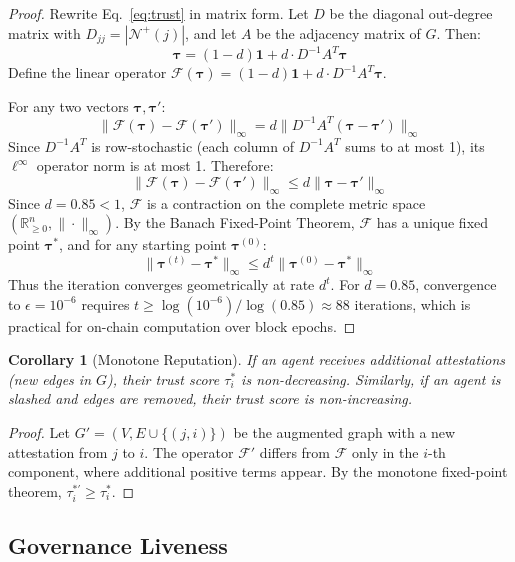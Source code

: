\documentclass[conference]{IEEEtran}
\newtheorem{corollary}{Corollary}
\begin{document}
\begin{proof}
Rewrite Eq.~\eqref{eq:trust} in matrix form. Let $D$ be the diagonal out-degree matrix with $D_{jj} = |\mathcal{N}^+(j)|$, and let $A$ be the adjacency matrix of $G$. Then:
\[
\boldsymbol{\tau} = (1-d)\mathbf{1} + d \cdot D^{-1}A^T \boldsymbol{\tau}
\]
Define the linear operator $\mathcal{F}(\boldsymbol{\tau}) = (1-d)\mathbf{1} + d \cdot D^{-1}A^T \boldsymbol{\tau}$.

For any two vectors $\boldsymbol{\tau}, \boldsymbol{\tau}'$:
\[
\|\mathcal{F}(\boldsymbol{\tau}) - \mathcal{F}(\boldsymbol{\tau}')\|_\infty = d\|D^{-1}A^T(\boldsymbol{\tau} - \boldsymbol{\tau}')\|_\infty
\]
Since $D^{-1}A^T$ is row-stochastic (each column of $D^{-1}A^T$ sums to at most 1), its $\ell^\infty$ operator norm is at most 1. Therefore:
\[
\|\mathcal{F}(\boldsymbol{\tau}) - \mathcal{F}(\boldsymbol{\tau}')\|_\infty \leq d \|\boldsymbol{\tau} - \boldsymbol{\tau}'\|_\infty
\]
Since $d = 0.85 < 1$, $\mathcal{F}$ is a contraction on the complete metric space $(\mathbb{R}^n_{\geq 0}, \|\cdot\|_\infty)$. By the Banach Fixed-Point Theorem, $\mathcal{F}$ has a unique fixed point $\boldsymbol{\tau}^*$, and for any starting point $\boldsymbol{\tau}^{(0)}$:
\[
\|\boldsymbol{\tau}^{(t)} - \boldsymbol{\tau}^*\|_\infty \leq d^t \|\boldsymbol{\tau}^{(0)} - \boldsymbol{\tau}^*\|_\infty
\]
Thus the iteration converges geometrically at rate $d^t$. For $d = 0.85$, convergence to $\epsilon = 10^{-6}$ requires $t \geq \log(10^{-6})/\log(0.85) \approx 88$ iterations, which is practical for on-chain computation over block epochs.
\end{proof}

\begin{corollary}[Monotone Reputation]
If an agent receives additional attestations (new edges in $G$), their trust score $\tau_i^*$ is non-decreasing. Similarly, if an agent is slashed and edges are removed, their trust score is non-increasing.
\end{corollary}

\begin{proof}
Let $G' = (V, E \cup \{(j, i)\})$ be the augmented graph with a new attestation from $j$ to $i$. The operator $\mathcal{F}'$ differs from $\mathcal{F}$ only in the $i$-th component, where additional positive terms appear. By the monotone fixed-point theorem, $\tau_i^{*\prime} \geq \tau_i^*$.
\end{proof}

\subsection{Governance Liveness}
\end{document}
